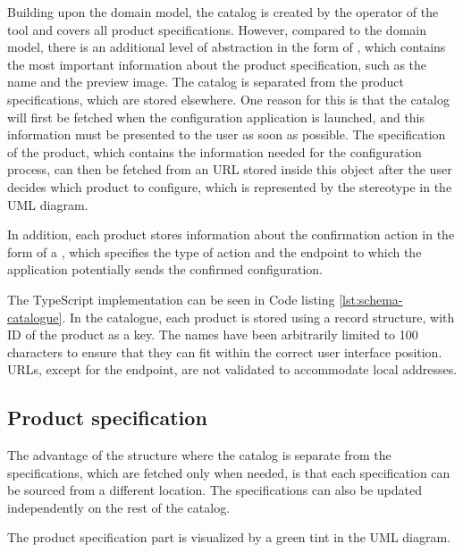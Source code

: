 Building upon the domain model, the catalog is created by the operator of the tool and covers all product specifications. However, compared to the domain model, there is an additional level of abstraction in the form of , which contains the most important information about the product specification, such as the name and the preview image. The catalog is separated from the product specifications, which are stored elsewhere. One reason for this is that the catalog will first be fetched when the configuration application is launched, and this information must be presented to the user as soon as possible. The specification of the product, which contains the information needed for the configuration process, can then be fetched from an URL stored inside this object after the user decides which product to configure, which is represented by the stereotype  in the UML diagram.

In addition, each product stores information about the confirmation action in the form of a , which specifies the type of action and the endpoint to which the application potentially sends the confirmed configuration.

The TypeScript implementation can be seen in Code listing \ref{lst:schema-catalogue}. In the catalogue, each product is stored using a record structure, with ID of the product as a key. The names have been arbitrarily limited to 100 characters to ensure that they can fit within the correct user interface position. URLs, except for the endpoint, are not validated to accommodate local addresses.


\subsection{Product specification}

The advantage of the structure where the catalog is separate from the specifications, which are fetched only when needed, is that each specification can be sourced from a different location. The specifications can also be updated independently on the rest of the catalog.

The product specification part is visualized by a green tint in the UML diagram.  

